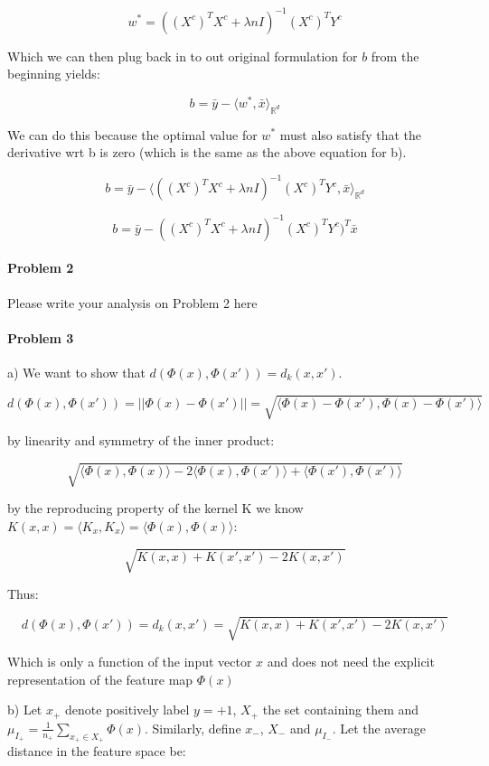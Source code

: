 \documentclass[12pt]{report}
\begin{document}
$$w^* = ((X^c)^TX^c + \lambda n I)^{-1}(X^c)^TY^c$$

Which we can then plug back in to out original formulation for $b$ from the beginning yields:

$$b= \bar{y} -\langle w^*, \bar{x} \rangle_{\mathbb{R}^d}$$

We can do this because the optimal value for $w^*$ must also satisfy that the derivative wrt b is zero (which is the same as the above equation for b).

$$b= \bar{y} -\langle ((X^c)^TX^c + \lambda n I)^{-1}(X^c)^TY^c, \bar{x} \rangle_{\mathbb{R}^d}$$

$$b= \bar{y} -((X^c)^TX^c + \lambda n I)^{-1}(X^c)^TY^c)^T \bar{x}$$

\paragraph{Problem 2}
Please write your analysis on Problem 2 here



\paragraph{Problem 3}

a) We want to show that $d(\Phi(x), \Phi(x')) = d_{k}(x, x') $.

$$d(\Phi(x), \Phi(x')) = || \Phi(x) - \Phi(x')|| = \sqrt{ \langle \Phi(x) - \Phi(x'), \Phi(x) - \Phi(x') \rangle}$$

by linearity and symmetry of the inner product:

$$\sqrt{ \langle \Phi(x), \Phi(x) \rangle -  2\langle \Phi(x), \Phi(x') \rangle + \langle \Phi(x'), \Phi(x') \rangle}$$

by the reproducing property of the kernel K we know $K(x,x) = \langle K_x, K_x \rangle =\langle \Phi(x), \Phi(x) \rangle$:

$$\sqrt{ K(x,x) + K(x',x') - 2K(x,x')  }$$

Thus:

$$d(\Phi(x), \Phi(x')) =  d_{k}(x, x') = \sqrt{ K(x,x) + K(x',x') - 2K(x,x')  }$$

Which is only a function of the input vector $x$ and does not need the explicit representation of the feature map $\Phi(x)$

b) Let $x_+$ denote positively label $y = +1$, $X_+$ the set containing them and $ \mu_{I_+} =  \frac{1}{n_+}\sum_{x_+ \in X_+} \Phi(x) $. Similarly, define $x_-$, $X_-$ and $ \mu_{I_-}$. Let the average distance in the feature space be:
\end{document}
